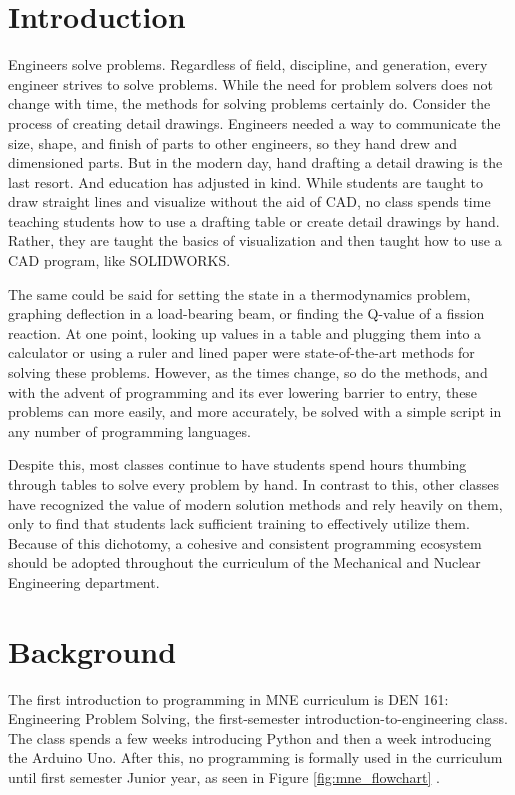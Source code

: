 \section{Introduction}

Engineers solve problems. Regardless of field, discipline, and generation, every engineer
strives to solve problems. While the need for problem solvers does not change with time,
the methods for solving problems certainly do. Consider the process of creating detail 
drawings. Engineers needed a way to communicate the size, shape, and finish of parts to 
other engineers, so they hand drew and dimensioned parts. But in the modern day, 
hand drafting a detail drawing is the last resort. And education has adjusted in
kind. While students are taught to draw straight lines and visualize
without the aid of CAD, no class spends time teaching students how to use a drafting table
or create detail drawings by hand. Rather, they are taught the basics of visualization
and then taught how to use a CAD program, like SOLIDWORKS.

The same could be said for setting the state in a thermodynamics problem, graphing
deflection in a load-bearing beam, or finding the Q-value of a fission reaction. At one
point, looking up values in a table and plugging them into a calculator or using a ruler
and lined paper were state-of-the-art methods for solving these problems. However, as the 
times change, so do the methods, and with the advent of programming and its ever lowering 
barrier to entry, these problems can more easily, and more accurately, be solved with a 
simple script in any number of programming languages.

Despite this, most classes continue to have students spend hours thumbing through tables
to solve every problem by hand. In contrast to this, other classes have recognized the
value of modern solution methods and rely heavily on them, only to find that students
lack sufficient training to effectively utilize them. Because of this dichotomy, a cohesive 
and consistent programming ecosystem should be adopted throughout the curriculum 
of the Mechanical and Nuclear Engineering department.


\section{Background}

The first introduction to programming in MNE curriculum is DEN 161: Engineering Problem Solving,
the first-semester introduction-to-engineering class. The class spends a few weeks introducing
Python and then a week introducing the Arduino Uno. After this, no programming is formally used in the
curriculum until first semester Junior year, as seen in Figure \ref{fig:mne_flowchart}
\cite{flowchart2022}. 

